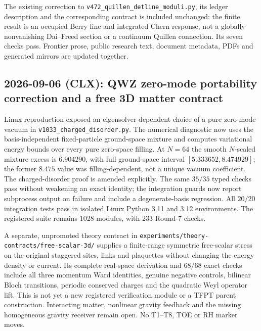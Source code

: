 The existing correction to \texttt{v472\_quillen\_detline\_moduli.py},
its ledger description and the corresponding contract is included unchanged:
the finite result is an occupied Berry line and integrated Chern response,
not a globally nonvanishing Dai--Freed section or a continuum Quillen
connection. Its seven checks pass. Frontier prose, public research text,
document metadata, PDFs and generated mirrors are updated together.

\subsection*{2026-09-06 (CLX): QWZ zero-mode portability correction and a free 3D matter contract}
Linux reproduction exposed an eigensolver-dependent choice of a pure
zero-mode vacuum in \texttt{v1033\_charged\_disorder.py}. The numerical
diagnostic now uses the basis-independent fixed-particle ground-space mixture
and computes variational energy bounds over every pure zero-space filling.
At $N=64$ the smooth $N$-scaled mixture excess is $6.904290$, with full
ground-space interval $[5.333652,8.474929]$; the former $8.475$ value was
filling-dependent, not a unique vacuum coefficient. The charged-disorder
proof is amended explicitly. The same $35/35$ typed checks pass without
weakening an exact identity; the integration guards now report subprocess
output on failure and include a degenerate-basis regression. All $20/20$
integration tests pass in isolated Linux Python 3.11 and 3.12 environments.
The registered suite remains 1028 modules, with 233 Round-7 checks.

A separate, unpromoted theory contract in
\texttt{experiments/theory-contracts/free-scalar-3d/} supplies a finite-range
symmetric free-scalar stress on the original staggered sites, links and
plaquettes without changing the energy density or current. Its complete
real-space derivation and $68/68$ exact checks include all three momentum
Ward identities, genuine negative controls, bilinear Bloch transitions,
periodic conserved charges and the quadratic Weyl operator lift. This is
not yet a new registered verification module or a TFPT parent construction.
Interacting matter, nonlinear gravity feedback and the missing homogeneous
gravity receiver remain open. No T1--T8, TOE or RH marker moves.

